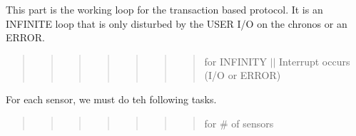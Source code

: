 This part is the working loop for the transaction based protocol. It is an I\-N\-F\-I\-N\-I\-T\-E loop that is only disturbed by the U\-S\-E\-R I/\-O on the chronos or an E\-R\-R\-O\-R. \begin{quotation}
\begin{quotation}
\begin{quotation}
\begin{quotation}
\begin{quotation}
\begin{quotation}
\begin{quotation}
for I\-N\-F\-I\-N\-I\-T\-Y $|$$|$ Interrupt occurs (I/\-O or E\-R\-R\-O\-R)

\end{quotation}


\end{quotation}


\end{quotation}


\end{quotation}


\end{quotation}


\end{quotation}


\end{quotation}


For each sensor, we must do teh following tasks. \begin{quotation}
\begin{quotation}
\begin{quotation}
\begin{quotation}
\begin{quotation}
\begin{quotation}
\begin{quotation}
for \# of sensors

\end{quotation}


\end{quotation}


\end{quotation}


\end{quotation}


\end{quotation}


\end{quotation}


\end{quotation}


